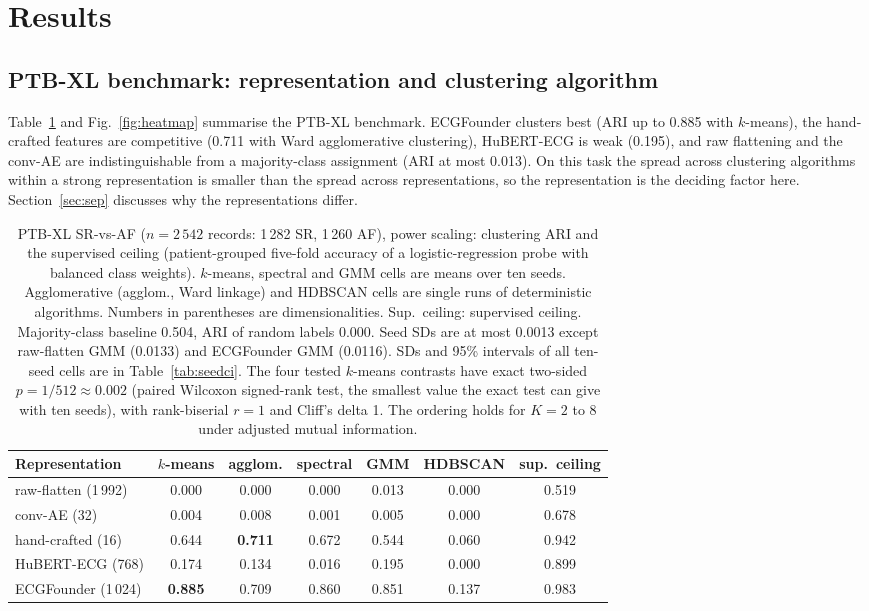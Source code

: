 \documentclass[preprint,11pt]{elsarticle}
\begin{document}
\section{Results}\label{sec:results}

\subsection{PTB-XL benchmark: representation and clustering algorithm}

Table~\ref{tab:main} and Fig.~\ref{fig:heatmap} summarise the PTB-XL benchmark.
ECGFounder clusters best (ARI up to 0.885 with $k$-means), the hand-crafted features
are competitive (0.711 with Ward agglomerative clustering), HuBERT-ECG is weak (0.195),
and raw flattening and the conv-AE are indistinguishable from a majority-class assignment
(ARI at most 0.013). On this task the spread across clustering algorithms within a strong
representation is smaller than the spread across representations, so the representation
is the deciding factor here. Section~\ref{sec:sep} discusses why the representations
differ.

\begin{table}[t]
\centering
\caption{PTB-XL SR-vs-AF ($n = 2\,542$ records: 1\,282 SR, 1\,260 AF), power scaling:
clustering ARI and the supervised ceiling (patient-grouped five-fold accuracy of a
logistic-regression probe with balanced class weights). $k$-means, spectral and GMM cells
are means over ten seeds. Agglomerative (agglom., Ward linkage) and HDBSCAN cells are single
runs of deterministic algorithms. Numbers in parentheses are dimensionalities. Sup.\
ceiling: supervised ceiling. Majority-class baseline 0.504, ARI of random labels 0.000.
Seed SDs are at most 0.0013 except raw-flatten GMM (0.0133) and ECGFounder GMM (0.0116).
SDs and 95\% intervals of all ten-seed cells are in Table~\ref{tab:seedci}. The four
tested $k$-means contrasts have exact two-sided $p=1/512\approx 0.002$ (paired Wilcoxon
signed-rank test, the smallest value the exact test can give with ten seeds), with
rank-biserial $r=1$ and Cliff's delta 1.
The ordering holds for $K=2$ to $8$ under adjusted mutual information.}
\label{tab:main}
\begin{tabular}{lcccccc}
\toprule
Representation & $k$-means & agglom. & spectral & GMM & HDBSCAN & sup.\ ceiling \\
\midrule
raw-flatten (1\,992)    & 0.000 & 0.000 & 0.000 & 0.013 & 0.000 & 0.519 \\
conv-AE (32)            & 0.004 & 0.008 & 0.001 & 0.005 & 0.000 & 0.678 \\
hand-crafted (16)       & 0.644 & \textbf{0.711} & 0.672 & 0.544 & 0.060 & 0.942 \\
HuBERT-ECG (768)        & 0.174 & 0.134 & 0.016 & 0.195 & 0.000 & 0.899 \\
ECGFounder (1\,024)     & \textbf{0.885} & 0.709 & 0.860 & 0.851 & 0.137 & 0.983 \\
\bottomrule
\end{tabular}
\end{table}
\end{document}
